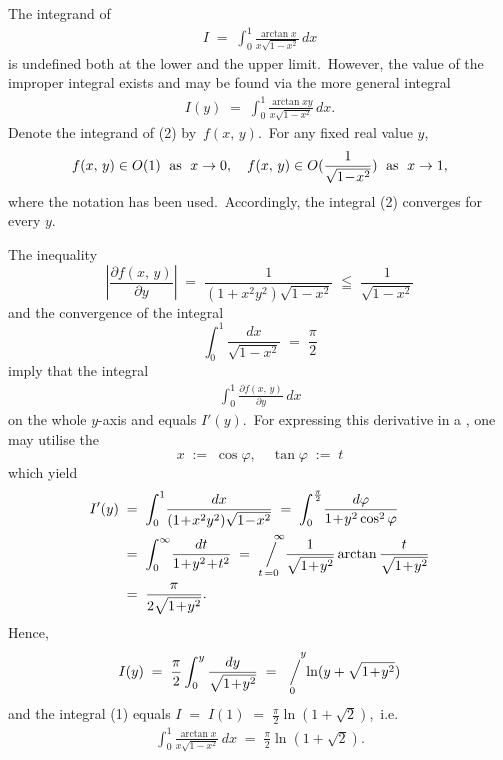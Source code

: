 \documentclass[12pt]{article}
\newcommand{\sijoitus}[2]%
{\operatornamewithlimits{\Big/}_{\!\!\!#1}^{\,#2}}
\begin{document}
The integrand of 
\begin{align}
I \;=\; \int_0^1\frac{\arctan{x}}{x\sqrt{1\!-\!x^2}}\,dx
\end{align}
is undefined both at the lower and the upper limit.\, However, the value of the improper integral exists and may be found via the more general integral
\begin{align}
I(y) \;=\; \int_0^1\frac{\arctan{xy}}{x\sqrt{1\!-\!x^2}}\,dx.
\end{align}
Denote the integrand of (2) by\, $f(x,\,y)$.\, For any fixed real value $y$, 
$$f(x,\,y) \in O(1) \mbox{\; as \;} x \to 0, \quad
  f(x,\,y) \in O(\frac{1}{\sqrt{1\!-\!x^2}}) \mbox{\; as \;} x \to 1,$$
where the  notation has been used.\, Accordingly, the integral (2) converges for every $y$.

The inequality
$$\left|\frac{\partial f(x,\,y)}{\partial y}\right| \;=\; \frac{1}{(1\!+\!x^2y^2)\sqrt{1\!-\!x^2}} 
\;\leqq\; \frac{1}{\sqrt{1\!-\!x^2}}$$
and the convergence of the integral
$$\int_0^1\!\frac{dx}{\sqrt{1\!-\!x^2}} \;=\; \frac{\pi}{2}$$
imply that the integral
\begin{align}
\int_0^1\frac{\partial f(x,\,y)}{\partial y}\,dx
\end{align}
 on the whole $y$-axis and equals $I'(y)$.\, For expressing this derivative in a , one may utilise the 
$$x \;:=\; \cos\varphi, \quad \tan\varphi \;:=\; t$$
which yield
\begin{align*}
I'(y) & \;=\; \int_0^1\!\frac{dx}{(1\!+\!x^2y^2)\sqrt{1\!-\!x^2}} 
\;=\; \int_0^{\frac{\pi}{2}}\!\frac{d\varphi}{1\!+\!y^2\cos^2\varphi}\\ 
      & \;=\; \int_0^\infty\!\frac{dt}{1\!+\!y^2\!+\!t^2} 
\;=\; \sijoitus{t\,=0}{\quad\infty}\!\frac{1}{\sqrt{1\!+\!y^2}}\arctan\frac{t}{\sqrt{1\!+\!y^2}}\\   
      & \;=\; \frac{\pi}{2\sqrt{1\!+\!y^2}}.
\end{align*}
Hence,
$$I(y) \;=\; \frac{\pi}{2}\int_0^y\frac{dy}{\sqrt{1\!+\!y^2}} \;=\; \sijoitus{0}{\quad y}\!\ln(y+\sqrt{1\!+\!y^2})$$
and the integral (1) equals \;$I \;=\; I(1) \;=\; \frac{\pi}{2}\ln(1\!+\!\sqrt{2})$,\, i.e.
\begin{align}
\int_0^1\frac{\arctan{x}}{x\sqrt{1\!-\!x^2}}\,dx \;=\; \frac{\pi}{2}\ln(1\!+\!\sqrt{2}).
\end{align}

\end{document}
